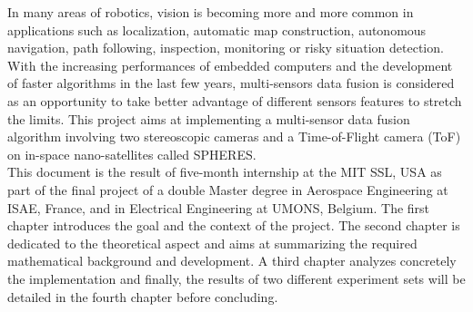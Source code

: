 \cleardoublepage
\setcounter{savepage}{\thepage}
\begin{abstractpage}
In many areas of robotics, vision is becoming more and more common in applications such as localization, automatic map construction, autonomous navigation, path following, inspection, monitoring or risky situation detection. With the increasing performances of embedded computers and the development of faster algorithms in the last few years, multi-sensors data fusion is considered as an opportunity to take better advantage of different sensors features to stretch the limits. This project aims at implementing a multi-sensor data fusion algorithm involving two stereoscopic cameras and a Time-of-Flight camera (\gls{ToF}) on in-space nano-satellites called SPHERES.\\
This document is the result of five-month internship at the MIT SSL, USA as part of the final project of a double Master degree in Aerospace Engineering at ISAE, France, and in Electrical Engineering at UMONS, Belgium. The first chapter introduces the goal and the context of the project. The second chapter is dedicated to the theoretical aspect and aims at summarizing the required mathematical background and development. A third chapter analyzes concretely the implementation and finally, the results of two different experiment sets will be detailed in the fourth chapter before concluding.
\end{abstractpage}

% 

\cleardoublepage

